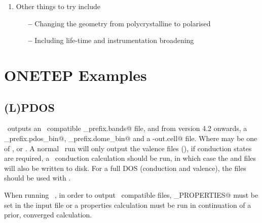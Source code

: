 \documentclass[a4paper,11pt,twoside]{book}
\begin{document}
{\begin{enumerate}
\begin{verbatim}
     %BLOCK POSITIONS_FRAC
            Si:exi    0.0000000000    0.0000000000    0.0000000000
            Si        0.5000000000    0.5000000000    0.0000000000
            Si        0.5000000000    0.0000000000    0.5000000000
            Si        0.0000000000    0.5000000000    0.5000000000
            Si        0.2500000000    0.2500000000    0.2500000000
            Si        0.7500000000    0.2500000000    0.7500000000
            Si        0.2500000000    0.7500000000    0.7500000000
            Si        0.7500000000    0.7500000000    0.2500000000
      %ENDBLOCK POSITIONS_FRAC
\end{verbatim}
Run \optados\ and compare the spectrum from the face-centred unit cell with that from the primitive unit cell.  Continue constructing larger unit cells until the core-hole spectrum stops changing with increasing separation between the periodic images.

\item Other things to try include
\begin{itemize}
\item[{\bf --}] Changing the geometry from polycrystalline to polarised
\item[{\bf --}] Including life-time and instrumentation broadening
\end{itemize}
\end{enumerate}

\chapter{ONETEP Examples}
\section{(L)PDOS}
\onetep\ outputs an \optados\ compatible \verb@seedname_prefix.bands@ file, and from version 4.2 onwards, a \verb@seedname_prefix.pdos_bin@, \verb@seedname_prefix.dome_bin@ and a \verb@seedname-out.cell@ file. Where \verb@prefix@ may be one of \verb@val@, \verb@cond@ or \verb@joint@.
%
A normal \onetep\  run will only output the valence files (\verb@val@), if conduction states are required, a \onetep\  conduction calculation should be run, in which case the \verb@cond@ and \verb@joint@ files will also be written to disk.
%
For a full DOS (conduction and valence), the \verb@joint@ files should be used with \optados.

When running \onetep\ , in order to output \optados\ compatible files, \verb@DO_PROPERTIES@ must be set in the input file or a properties calculation must be run in continuation of a prior, converged calculation.

}
\end{document}
